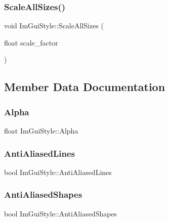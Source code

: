 \subsubsection{\texorpdfstring{Scale\+All\+Sizes()}{ScaleAllSizes()}}
{\footnotesize\ttfamily void Im\+Gui\+Style\+::\+Scale\+All\+Sizes (\begin{DoxyParamCaption}\item[{float}]{scale\+\_\+factor }\end{DoxyParamCaption})}



\subsection{Member Data Documentation}
\hypertarget{struct_im_gui_style_a993312606e9dcb7ca165245150a4da72}{}\label{struct_im_gui_style_a993312606e9dcb7ca165245150a4da72} 
\subsubsection{\texorpdfstring{Alpha}{Alpha}}
{\footnotesize\ttfamily float Im\+Gui\+Style\+::\+Alpha}

\hypertarget{struct_im_gui_style_a0164b54454297971d40f3578b2c1ffeb}{}\label{struct_im_gui_style_a0164b54454297971d40f3578b2c1ffeb} 
\subsubsection{\texorpdfstring{Anti\+Aliased\+Lines}{AntiAliasedLines}}
{\footnotesize\ttfamily bool Im\+Gui\+Style\+::\+Anti\+Aliased\+Lines}

\hypertarget{struct_im_gui_style_ae3c6b2f226fe51631352a637f3defabb}{}\label{struct_im_gui_style_ae3c6b2f226fe51631352a637f3defabb} 
\subsubsection{\texorpdfstring{Anti\+Aliased\+Shapes}{AntiAliasedShapes}}
{\footnotesize\ttfamily bool Im\+Gui\+Style\+::\+Anti\+Aliased\+Shapes}

